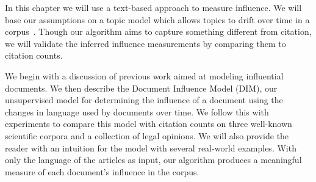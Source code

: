 

In this chapter we will use a text-based approach to measure influence.
We will base our assumptions on a topic model which allows topics to drift
over time in a corpus~\citep{blei:2006}. Though our algorithm aims to
capture something different from citation, we will validate the
inferred influence measurements by comparing them to citation counts.

We begin with a discussion of previous work aimed at modeling
influential documents.  We then describe the Document Influence Model
(DIM), our unsupervised model for determining the influence of a
document using the changes in language used by documents over time.
We follow this with experiments to compare this model with citation
counts on three well-known scientific corpora and a collection of
legal opinions.  We will also provide the reader with an intuition for
the model with several real-world examples. With only the language of
the articles as input, our algorithm produces a meaningful measure of
each document's influence in the corpus.
